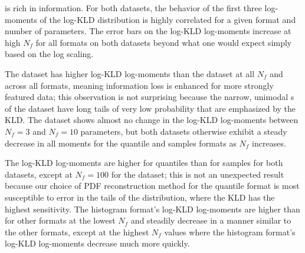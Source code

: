  is rich in information.
For both datasets, the behavior of the first three log-moments of the log-KLD 
distribution is highly correlated for a given format and number of parameters.
The error bars on the log-KLD log-moments increase at high $N_{f}$ for all 
formats on both datasets beyond what one would expect simply based on the log 
scaling.

The \mgdata dataset has higher log-KLD log-moments than the \ssdata dataset at 
all $N_{f}$ and across all formats, meaning information loss is enhanced for 
more strongly featured data; this observation is not surprising because the 
narrow, unimodal \pz s of the \mgdata dataset have long tails of very low 
probability that are emphasized by the KLD.
The \ssdata dataset shows almost no change in the log-KLD log-moments between 
$N_{f}=3$ and $N_{f}=10$ parameters, but both datasets otherwise exhibit a 
steady decrease in all moments for the quantile and samples formats as $N_{f}$ 
increases.

The log-KLD log-moments are higher for quantiles than for samples for both 
datasets, except at $N_{f}=100$ for the \mgdata dataset; this is not an 
unexpected result because our choice of PDF reconstruction method for the 
quantile format is most susceptible to error in the tails of the distribution, 
where the KLD has the highest sensitivity.
The histogram format's log-KLD log-moments are higher than for other formats at 
the lowest $N_{f}$ and steadily decrease in a manner similar to the other 
formats, except at the highest $N_{f}$ values where the histogram format's 
log-KLD log-moments decrease much more quickly.


